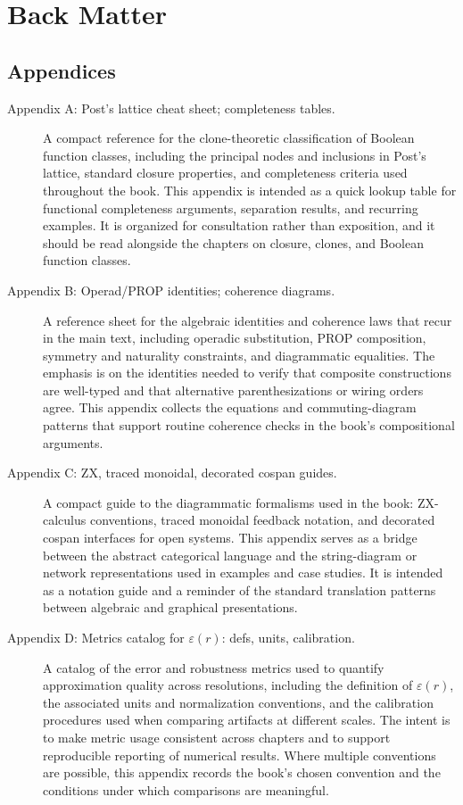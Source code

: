 \documentclass[11pt]{article}
\begin{document}

\section{Back Matter}

\subsection{Appendices}


\begin{description}
  \item[Appendix A: Post's lattice cheat sheet; completeness tables.] A compact reference for the clone-theoretic classification of Boolean function classes, including the principal nodes and inclusions in Post's lattice, standard closure properties, and completeness criteria used throughout the book. This appendix is intended as a quick lookup table for functional completeness arguments, separation results, and recurring examples. It is organized for consultation rather than exposition, and it should be read alongside the chapters on closure, clones, and Boolean function classes.

  \item[Appendix B: Operad/PROP identities; coherence diagrams.] A reference sheet for the algebraic identities and coherence laws that recur in the main text, including operadic substitution, PROP composition, symmetry and naturality constraints, and diagrammatic equalities. The emphasis is on the identities needed to verify that composite constructions are well-typed and that alternative parenthesizations or wiring orders agree. This appendix collects the equations and commuting-diagram patterns that support routine coherence checks in the book's compositional arguments.

  \item[Appendix C: ZX, traced monoidal, decorated cospan guides.] A compact guide to the diagrammatic formalisms used in the book: ZX-calculus conventions, traced monoidal feedback notation, and decorated cospan interfaces for open systems. This appendix serves as a bridge between the abstract categorical language and the string-diagram or network representations used in examples and case studies. It is intended as a notation guide and a reminder of the standard translation patterns between algebraic and graphical presentations.

  \item[Appendix D: Metrics catalog for \(\varepsilon(r)\): defs, units, calibration.] A catalog of the error and robustness metrics used to quantify approximation quality across resolutions, including the definition of \(\varepsilon(r)\), the associated units and normalization conventions, and the calibration procedures used when comparing artifacts at different scales. The intent is to make metric usage consistent across chapters and to support reproducible reporting of numerical results. Where multiple conventions are possible, this appendix records the book's chosen convention and the conditions under which comparisons are meaningful.
\end{description}
\end{document}
